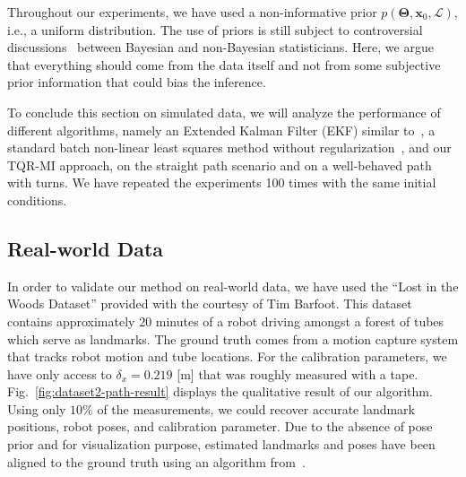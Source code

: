 Throughout our experiments, we have used a non-informative prior
$p(\boldsymbol{\Theta}, \mathbf{x}_0, \mathcal{L})$, i.e., a uniform
distribution. The use of priors is still subject to controversial
discussions~\cite{gelman08objections} between Bayesian and non-Bayesian
statisticians. Here, we argue that everything should come from the data itself
and not from some subjective prior information that could bias the inference.

To conclude this section on simulated data, we will analyze the performance of
different algorithms, namely an Extended Kalman Filter (EKF) similar
to~\cite{martinelli06automatic}, a standard batch non-linear least squares
method without regularization~\cite{kuemmerle11simultaneous}, and our TQR-MI
approach, on the straight path scenario and on a well-behaved path with turns.
We have repeated the experiments 100 times with the same initial conditions.

\subsection{Real-world Data}

In order to validate our method on real-world data, we have used the ``Lost in
the Woods Dataset'' provided with the courtesy of Tim Barfoot. This dataset
contains approximately $20$ minutes of a robot driving amongst a forest of
tubes which serve as landmarks. The ground truth comes from a motion capture
system that tracks robot motion and tube locations. For the calibration
parameters, we have only access to $\delta_x=0.219$ [m] that was roughly
measured with a tape. Fig.~\ref{fig:dataset2-path-result} displays the
qualitative result of our algorithm. Using only $10\%$ of the measurements, we
could recover accurate landmark positions, robot poses, and calibration
parameter. Due to the absence of pose prior and for visualization purpose,
estimated landmarks and poses have been aligned to the ground truth using an
algorithm from~\cite{fiore01efficient}.

